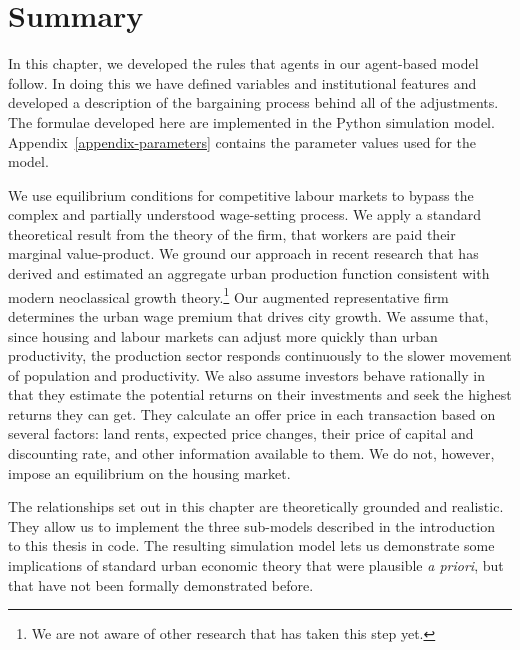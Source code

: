  
\section{Summary}
In this chapter, we developed the rules that agents in our agent-based model follow. In doing this we have defined variables and institutional features and developed a description of the bargaining process behind all of the adjustments. The formulae developed here are implemented in the Python simulation model. %
Appendix~\ref{appendix-parameters} contains the parameter values used for the model.  %

 We use equilibrium conditions for competitive labour markets to bypass the complex and partially understood wage-setting process. We apply a standard theoretical result from the theory of the firm, that workers are paid their \gls{marginal value-product}. We ground our approach in recent research that has derived and estimated an aggregate urban production function consistent with modern \gls{neoclassical growth theory}.\footnote{We are not aware of other research that has taken this step yet.} Our augmented representative firm determines the urban wage premium that drives city growth. We assume that, since housing and labour markets can adjust more quickly than urban productivity, the production sector responds continuously to the slower movement of population and productivity. %
We also assume investors behave rationally in that they estimate the potential returns on their investments and seek the highest returns they can get. They calculate an offer price in each transaction based on several factors: land rents, expected price changes, their price of capital and discounting rate, and other information available to them. We do not, however, impose an equilibrium on the housing market.

The relationships set out in this chapter are theoretically grounded and realistic. They allow us to implement the three sub-models described in the introduction to this thesis in code. The resulting simulation model lets us demonstrate some implications of standard urban economic theory that were plausible \textit{a priori}, but that have not been formally demonstrated before.  


